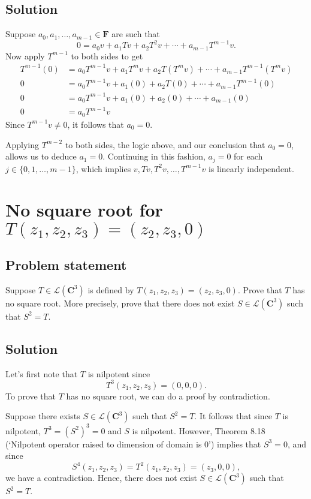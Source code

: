 \documentclass{article}
\begin{document}
\subsection*{Solution}
Suppose $a_0,a_1,\ldots,a_{m-1}\in\mathbf{F}$ are such that 
\[0=a_0v+a_1Tv+a_2T^2v+\cdots+a_{m-1}T^{m-1}v.\]
Now apply $T^{m-1}$ to both sides to get
\begin{align*}
    T^{m-1}(0)&=a_0T^{m-1}v+a_1T^mv+a_2T(T^mv)+\cdots+a_{m-1}T^{m-1}(T^mv)\\
    0&=a_0T^{m-1}v+a_1(0)+a_2T(0)+\cdots+a_{m-1}T^{m-1}(0)\\
    0&=a_0T^{m-1}v+a_1(0)+a_2(0)+\cdots+a_{m-1}(0)\\
    0&=a_0T^{m-1}v
\end{align*}
Since $T^{m-1}v\neq 0$, it follows that $a_0=0$.

Applying $T^{m-2}$ to both sides, the logic above, and our conclusion that $a_0=0$, allows us to deduce $a_1=0$. 
Continuing in this fashion, $a_j=0$ for each $j\in\{0,1,\ldots,m-1\}$, which implies $v,Tv,T^2v,\ldots,T^{m-1}v$ is linearly independent.

\clearpage

\section{No square root for $T(z_1,z_2,z_3)=(z_2,z_3,0)$}
\subsection*{Problem statement}
Suppose $T\in\mathcal{L}(\mathbf{C}^3)$ is defined by $T(z_1,z_2,z_3)=(z_2,z_3,0)$. 
Prove that $T$ has no square root. 
More precisely, prove that there does not exist $S\in\mathcal{L}(\mathbf{C}^3)$ such that $S^2=T$.

\subsection*{Solution}
Let's first note that $T$ is nilpotent since 
\[T^3(z_1,z_2,z_3)=(0,0,0).\]
To prove that $T$ has no square root, we can do a proof by contradiction.

Suppose there exists $S\in\mathcal{L}(\mathbf{C}^3)$ such that $S^2=T$. 
It follows that since $T$ is nilpotent, $T^3=(S^2)^3=0$ and $S$ is nilpotent. 
However, Theorem 8.18 (`Nilpotent operator raised to dimension of domain is 0') implies that $S^3=0$, and since 
\[S^4(z_1,z_2,z_3)=T^2(z_1,z_2,z_3)=(z_3,0,0),\] 
we have a contradiction. 
Hence, there does not exist $S\in\mathcal{L}(\mathbf{C}^3)$ such that $S^2=T$.
\end{document}

